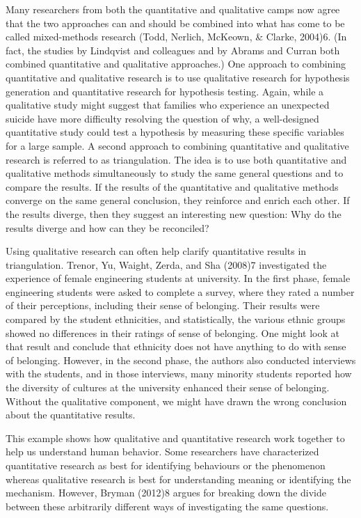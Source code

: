Many researchers from both the quantitative and qualitative camps now agree that the two approaches can and should be combined into what has come to be called mixed-methods research (Todd, Nerlich, McKeown, \& Clarke, 2004)6. (In fact, the studies by Lindqvist and colleagues and by Abrams and Curran both combined quantitative and qualitative approaches.) One approach to combining quantitative and qualitative research is to use qualitative research for hypothesis generation and quantitative research for hypothesis testing. Again, while a qualitative study might suggest that families who experience an unexpected suicide have more difficulty resolving the question of why, a well-designed quantitative study could test a hypothesis by measuring these specific variables for a large sample. A second approach to combining quantitative and qualitative research is referred to as triangulation. The idea is to use both quantitative and qualitative methods simultaneously to study the same general questions and to compare the results. If the results of the quantitative and qualitative methods converge on the same general conclusion, they reinforce and enrich each other. If the results diverge, then they suggest an interesting new question: Why do the results diverge and how can they be reconciled?

Using qualitative research can often help clarify quantitative results in triangulation. Trenor, Yu, Waight, Zerda, and Sha (2008)7 investigated the experience of female engineering students at university. In the first phase, female engineering students were asked to complete a survey, where they rated a number of their perceptions, including their sense of belonging. Their results were compared by the student ethnicities, and statistically, the various ethnic groups showed no differences in their ratings of sense of belonging. One might look at that result and conclude that ethnicity does not have anything to do with sense of belonging. However, in the second phase, the
authors also conducted interviews with the students, and in those interviews, many minority students reported how the diversity of cultures at the university enhanced their sense of belonging. Without the qualitative component, we might have drawn the wrong conclusion about the quantitative results.

This example shows how qualitative and quantitative research work together to help us understand human behavior. Some researchers have characterized quantitative research as best for identifying behaviours or the phenomenon whereas qualitative research is best for understanding meaning or identifying the mechanism. However, Bryman (2012)8 argues for breaking down the divide between these arbitrarily different ways of investigating the same questions.



